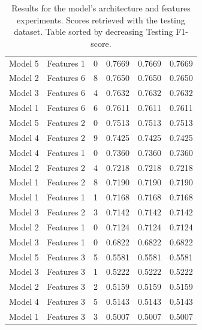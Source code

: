 \begin{table}[!h]
\begin{tabular}{c|c|c|c|c|c}
        Model 5     &   	Features 1      &   	0       &   	0.7669  &   	0.7669  &   	0.7669  \\
        Model 2     &   	Features 6      &   	8       &   	0.7650  &   	0.7650  &   	0.7650  \\
        Model 3     &   	Features 6      &   	4       &   	0.7632  &   	0.7632  &   	0.7632  \\
        Model 1     &   	Features 6      &   	6       &   	0.7611  &   	0.7611  &   	0.7611  \\
        Model 5     &   	Features 2      &   	0       &   	0.7513  &   	0.7513  &   	0.7513  \\
        Model 4     &   	Features 2      &   	9       &   	0.7425  &   	0.7425  &   	0.7425  \\
        Model 4     &   	Features 1      &   	0       &   	0.7360  &   	0.7360  &   	0.7360  \\
        Model 2     &   	Features 2      &   	4       &   	0.7218  &   	0.7218  &   	0.7218  \\
        Model 1     &   	Features 2      &   	8       &   	0.7190  &   	0.7190  &   	0.7190  \\
        Model 1     &   	Features 1      &   	1       &   	0.7168  &   	0.7168  &   	0.7168  \\
        Model 3     &   	Features 2      &   	3       &   	0.7142  &   	0.7142  &   	0.7142  \\
        Model 2     &   	Features 1      &   	0       &   	0.7124  &   	0.7124  &   	0.7124  \\
        Model 3     &   	Features 1      &   	0       &   	0.6822  &   	0.6822  &   	0.6822  \\
        Model 5     &   	Features 3      &   	5       &   	0.5581  &   	0.5581  &   	0.5581  \\
        Model 3     &   	Features 3      &   	1       &   	0.5222  &   	0.5222  &   	0.5222  \\
        Model 2     &   	Features 3      &   	2       &   	0.5159  &   	0.5159  &   	0.5159  \\
        Model 4     &   	Features 3      &   	5       &   	0.5143  &   	0.5143  &   	0.5143  \\
        Model 1     &   	Features 3      &   	3       &   	0.5007  &   	0.5007  &   	0.5007  \\
    \end{tabular}
    \caption{Results for the model's architecture and features experiments. Scores retrieved with the testing dataset. Table sorted by decreasing Testing F1-score.}
    \label{tab-annex:nn-experiments}
\end{table}


